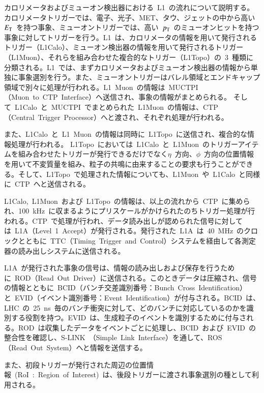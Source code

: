 カロリメータおよびミューオン検出器における~L1~の流れについて説明する。カロリメータトリガーでは、電子、光子、MET、タウ、ジェットの中から高い~$E_{\rm{T}}$~を持つ事象、ミューオントリガーでは、高い~$p_{\rm{T}}$~のミューオンヒットを持つ事象に対してトリガーを行う。L1~は、カロリメータの情報を用いて発行されるトリガー（L1Calo）、ミューオン検出器の情報を用いて発行されるトリガー（L1Muon）、それらを組み合わせた複合的なトリガー（L1Topo）の~3~種類に分類される。L1~では、まずカロリメータおよびミューオン検出器の情報から単独に事象選別を行う。また、ミューオントリガーはバレル領域とエンドキャップ領域で別々に処理が行われる。L1~Muon~の情報は~MUCTPI（Muon~to~CTP~Interface）へ送信され、事象の情報がまとめられる。
そして~L1Calo~と~MUCTPI~でまとめられた~L1Muon~の情報は、CTP（Central~Trigger~Processor）へと渡され、それぞれ処理が行われる。

また、L1Calo~と~L1~Muon~の情報は同時に~L1Topo~に送信され、複合的な情報処理が行われる。
L1Topo~においては~L1Calo~と~L1Muon~のトリガーアイテムを組み合わせたトリガーが発行できるだけでなく$\eta$~方向、$\phi$~方向の位置情報を用いて不変質量を組み、粒子の共鳴に由来することの要求も行うことができる。そして、L1Topo~で処理された情報についても、L1Muon~や~L1Calo~と同様に~CTP~へと送信される。

L1Calo,~L1Muon~および~L1Topo~の情報は、以上の流れから~CTP~に集められ、100~kHz~に収まるようにプリスケールがかけられたのちトリガー処理が行われる。CTP~で処理が行われ、データ読み出しが認められた信号に対しては~L1A（Level~1~Accept）が発行される。発行された~L1A~は~40~MHz~のクロックとともに~TTC（Timing~Trigger~and~Control）システムを経由して各測定器の読み出しシステムに送信される。

L1A~が発行された事象の信号は、情報の読み出しおよび保存を行うために~ROD（Read~Out~Driver）に送信される。このときデータは圧縮され、信号の情報とともに~BCID（バンチ交差識別番号：Bunch~Cross~Identification）と~EVID（イベント識別番号：Event~Identification）が付与される。BCID~は、LHC~の~25~ns~毎のバンチ衝突に対して、どのバンチに対応しているのかを識別する役割を持つ。EVID~は、生成粒子のイベントを識別するために付与される。ROD~は収集したデータをイベントごとに処理し、BCID~および~EVID~の整合性を確認し、S-LINK~\cite{URL:20}（Simple~Link~Interface）を通して、ROS（Read~Out~System）へと情報を送信する。

また、初段トリガーが発行された周辺の位置情報~(RoI~:~Region~of~Interest)~は、後段トリガーに渡され事象選別の種として利用される。

